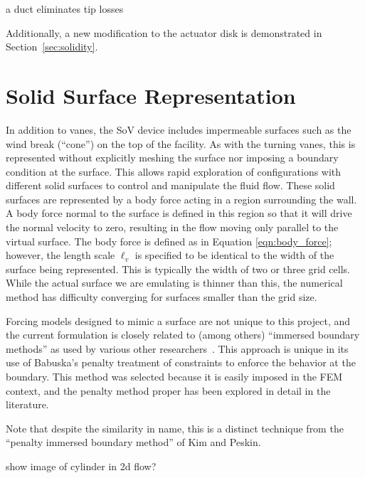 a duct eliminates tip losses

Additionally, a new modification to the actuator disk is demonstrated in 
Section~\ref{sec:solidity}. 

\section{Solid Surface Representation}
\label{subsec:solid_surface}

In addition to vanes, the SoV device includes impermeable surfaces
such as the wind break (``cone'') on the top of the facility. As with
the turning vanes, this is represented without explicitly meshing the
surface nor imposing  a boundary condition at the surface. This allows
rapid exploration of configurations  with different solid surfaces to
control and manipulate the fluid flow. These solid surfaces are
represented by a body force acting in a region surrounding the wall. 
A body force normal to the surface is defined in this region so
that it will drive the normal velocity to zero, resulting in the flow
moving only parallel to the virtual surface. 
The body force is defined as in Equation
\ref{eqn:body_force}; however, the length scale $\ell_v$ is specified to
be identical to the width of the surface being represented. This is
typically the width of two or three grid cells. While the actual surface we are
emulating is thinner than this, the numerical method has difficulty
converging for surfaces smaller than the grid size.  

Forcing models designed to mimic a surface
are not unique to this project, and the current formulation is
 closely related to (among others)
``immersed boundary methods'' as used by various other
researchers~\cite{doi:10.1146/annurev.fluid.37.061903.175743,verzicco1998complex}. This
approach is unique in its use of Babuska's penalty treatment of
constraints\cite{1973fempen,ZAMM:ZAMM19880680925} to enforce the
behavior at the boundary. This method was selected because it is easily
imposed in the FEM context, and the penalty method proper has been
explored in detail in the literature. 

Note that despite the similarity in name, this is a distinct technique
from the ``penalty immersed boundary method'' of Kim and
Peskin\cite{:/content/aip/journal/pof2/19/5/10.1063/1.2734674}.  

show image of cylinder in 2d flow? 

